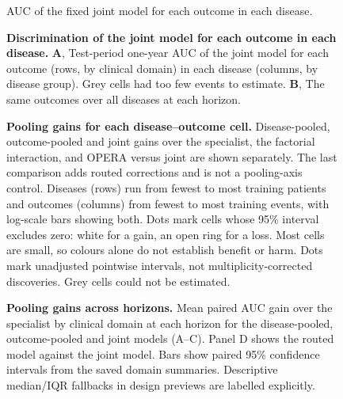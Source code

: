 \begin{figure}[p]
    {AUC of the fixed joint model for each outcome in each disease.}
  \caption{\textbf{Discrimination of the joint model for each outcome in each
  disease.} \textbf{A}, Test-period
  one-year AUC of the joint model for each outcome (rows, by clinical domain)
  in each disease (columns, by disease group). Grey cells had too few events to estimate. \textbf{B}, The same outcomes over all diseases at each horizon.}
  \label{fig:supp-atlas-matrix}
\end{figure}

\begin{figure}[p]
  \caption{\textbf{Pooling gains for each disease--outcome cell.} Disease-pooled, outcome-pooled and joint gains over the specialist, the
  factorial interaction, and OPERA versus joint are shown separately. The last
  comparison adds routed corrections and is not a pooling-axis control. Diseases (rows) run from fewest to most training patients and outcomes (columns) from fewest to most training events, with log-scale bars showing both. Dots mark cells whose 95\% interval excludes zero: white for a gain, an open ring for a loss. Most cells are small, so colours alone do not establish benefit or harm. Dots mark unadjusted
  pointwise intervals, not multiplicity-corrected discoveries. Grey cells could not be estimated.}
  \label{fig:supp-pooling-cells}
\end{figure}

\begin{figure}[p]
  \caption{\textbf{Pooling gains across horizons.} Mean paired AUC gain
  over the specialist by clinical domain at each horizon for the
  disease-pooled, outcome-pooled and joint models (A--C). Panel D shows the
  routed model against the joint model. Bars show paired 95\% confidence
  intervals from the saved domain summaries. Descriptive median/IQR fallbacks
  in design previews are labelled explicitly.}
  \label{fig:supp-horizons}
\end{figure}

